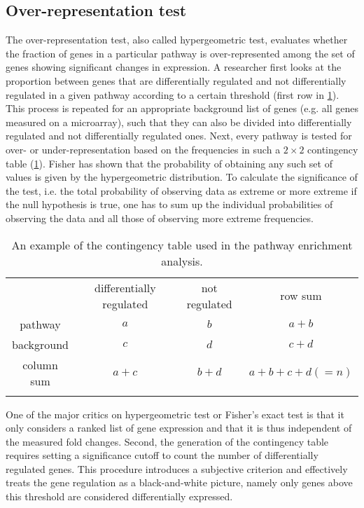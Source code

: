 \subsection{Over-representation test}
The over-representation test, also called hypergeometric test, 
evaluates whether the fraction of genes in a particular pathway is over-represented among the set 
of genes showing significant changes in expression. 
A researcher first looks at the proportion between genes 
that are 
differentially regulated and not differentially 
regulated in a given 
pathway according to a certain 
threshold (first row in \ref{table:contigency_table}). 
This process is repeated for an appropriate background 
list of genes (e.g. all genes measured on a microarray), 
such that they can also be divided into differentially 
regulated and not differentially regulated ones. 
Next, every pathway 
is tested for over- or under-representation based on the frequencies in such 
a $2 \times 2$ contingency table (\ref{table:contigency_table}). 
Fisher has shown that the probability of obtaining any such set of values is 
given by the hypergeometric distribution. To calculate the significance of the
test, i.e. the total probability of observing data as extreme or more extreme 
if the null hypothesis is true, one has to sum up the individual probabilities
of observing the data and all those of observing more extreme frequencies.

\begin{longtable}{cccc}
\caption[Contingency table example]{
An example of the contingency table used in the pathway enrichment analysis.} \\
\hline
& differentially regulated & not regulated & row sum \\
\rowcolor{Gray} pathway & $a$ & $b$ & $a+b$\\
background & $c$ & $d$ & $c+d$\\
\rowcolor{Gray} column sum & $a+c$ & $b+d$ & $a+b+c+d(=n)$\\
\hline
\label{table:contigency_table}
\end{longtable}

One of the major critics on hypergeometric test or 
Fisher's exact test is that it only considers a ranked
list of gene expression and that it is thus independent of the 
measured fold changes. Second, the generation of the contingency table
requires setting a significance cutoff to count the number of differentially
regulated genes. This procedure introduces a subjective criterion and 
effectively treats the gene regulation as a black-and-white picture, namely only 
genes above this threshold are considered differentially expressed.
    
